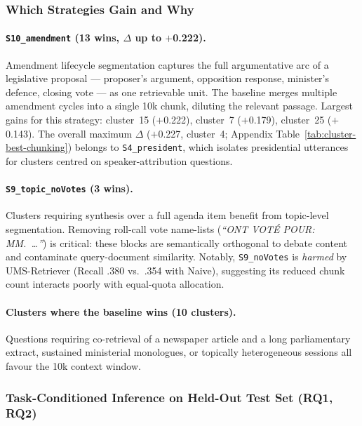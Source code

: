 \subsubsection{Which Strategies Gain and Why}
\label{sec:indexing-analysis}

\paragraph{\texttt{S10\_amendment} (13 wins, $\Delta$ up to $+$0.222).}
Amendment lifecycle segmentation captures the full argumentative arc of a
legislative proposal — proposer's argument, opposition response, minister's
defence, closing vote — as one retrievable unit.
The baseline merges multiple amendment cycles into a single 10k chunk, diluting
the relevant passage.
Largest gains for this strategy: cluster~15 ($+$0.222), cluster~7 ($+$0.179),
cluster~25 ($+$0.143).
The overall maximum $\Delta$ ($+$0.227, cluster~4; Appendix
Table~\ref{tab:cluster-best-chunking}) belongs to \texttt{S4\_president},
which isolates presidential utterances for clusters centred on
speaker-attribution questions.

\paragraph{\texttt{S9\_topic\_noVotes} (3 wins).}
Clusters requiring synthesis over a full agenda item benefit from topic-level
segmentation.
Removing roll-call vote name-lists (\textit{``ONT VOT\'{E} POUR: MM.~\ldots''})
is critical: these blocks are semantically orthogonal to debate content and
contaminate query-document similarity.
Notably, \texttt{S9\_noVotes} is \emph{harmed} by UMS-Retriever (Recall .380
vs.\ .354 with Naive), suggesting its reduced chunk count interacts poorly with
equal-quota allocation.

\paragraph{Clusters where the baseline wins (10 clusters).}
Questions requiring co-retrieval of a newspaper article and a long parliamentary
extract, sustained ministerial monologues, or topically heterogeneous sessions
all favour the 10k context window.

\subsubsection{Task-Conditioned Inference on Held-Out Test Set (\textbf{RQ1, RQ2})}
\label{sec:tc-inference-results}

